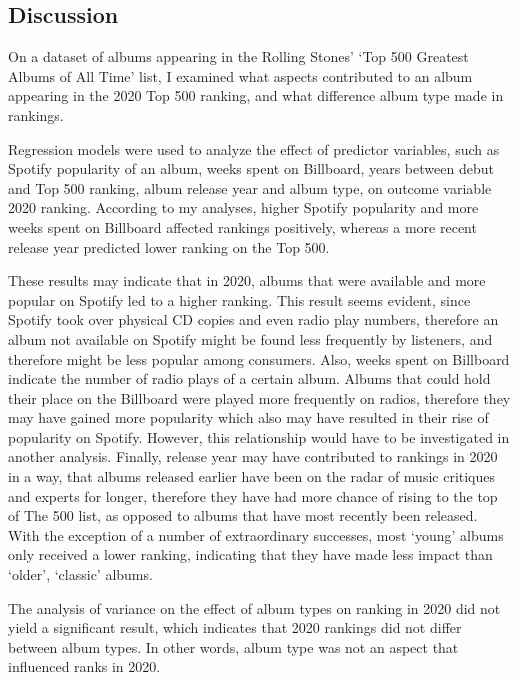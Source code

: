 \documentclass[
]{article}
\begin{document}
\subsection{Discussion}\label{discussion}

On a dataset of albums appearing in the Rolling Stones' `Top 500
Greatest Albums of All Time' list, I examined what aspects contributed
to an album appearing in the 2020 Top 500 ranking, and what difference
album type made in rankings.

Regression models were used to analyze the effect of predictor
variables, such as Spotify popularity of an album, weeks spent on
Billboard, years between debut and Top 500 ranking, album release year
and album type, on outcome variable 2020 ranking. According to my
analyses, higher Spotify popularity and more weeks spent on Billboard
affected rankings positively, whereas a more recent release year
predicted lower ranking on the Top 500.

These results may indicate that in 2020, albums that were available and
more popular on Spotify led to a higher ranking. This result seems
evident, since Spotify took over physical CD copies and even radio play
numbers, therefore an album not available on Spotify might be found less
frequently by listeners, and therefore might be less popular among
consumers. Also, weeks spent on Billboard indicate the number of radio
plays of a certain album. Albums that could hold their place on the
Billboard were played more frequently on radios, therefore they may have
gained more popularity which also may have resulted in their rise of
popularity on Spotify. However, this relationship would have to be
investigated in another analysis. Finally, release year may have
contributed to rankings in 2020 in a way, that albums released earlier
have been on the radar of music critiques and experts for longer,
therefore they have had more chance of rising to the top of The 500
list, as opposed to albums that have most recently been released. With
the exception of a number of extraordinary successes, most `young'
albums only received a lower ranking, indicating that they have made
less impact than `older', `classic' albums.

The analysis of variance on the effect of album types on ranking in 2020
did not yield a significant result, which indicates that 2020 rankings
did not differ between album types. In other words, album type was not
an aspect that influenced ranks in 2020.
\end{document}
